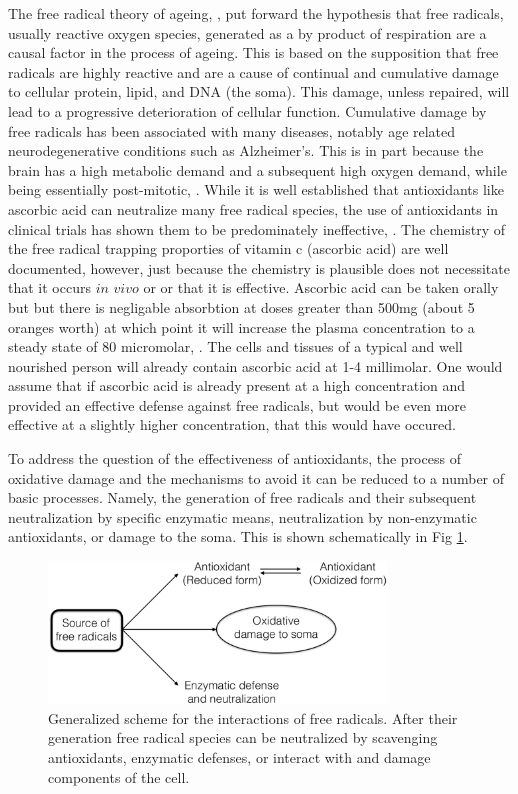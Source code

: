 \documentclass[preprint,12pt,authoryear]{elsarticle}
\begin{document}
The free radical theory of ageing, \citet{Harman:1956wu}, put forward the hypothesis that
free radicals, usually reactive oxygen species, generated as a by product of respiration are a causal
factor in the process of ageing. This is based on the supposition that free radicals are highly reactive
and are a cause of continual and cumulative damage to cellular protein, lipid, and
DNA (the soma). This damage, unless repaired, will lead to a progressive
deterioration of cellular function. Cumulative damage by free radicals has been associated
with many diseases, notably age related neurodegenerative conditions such as
Alzheimer's. This is in part because the brain has a high metabolic demand and a
subsequent high oxygen demand, while being essentially post-mitotic, \citet{Cobley:2018kt}.  
While it is well established that antioxidants like ascorbic acid can neutralize many free radical
species, the use of antioxidants in clinical trials has shown them to be predominately ineffective, \citet{Steinhubl:2008el}. 
The chemistry of the free radical trapping proporties of vitamin c (ascorbic acid) are well documented, however, just because the chemistry is plausible does not necessitate that it occurs $in$ $vivo$ or or that it is effective. Ascorbic acid can be taken orally but but there is negligable absorbtion at doses greater than 500mg (about 5 oranges worth) at which point it will increase the plasma concentration to a steady state of 80 micromolar, \citet{Padayatty:2003}. The cells and tissues of a typical and well nourished person will already contain ascorbic acid at 1-4 millimolar. One would assume that if ascorbic acid is already present at a high concentration and provided an effective defense against free radicals, but would be even more effective at a slightly higher concentration, that this would have occured.

To address the question of the effectiveness of antioxidants, the process of oxidative damage and the mechanisms to avoid it can be reduced to a number of basic processes. Namely, the generation of free radicals and their subsequent neutralization by specific enzymatic means, neutralization by non-enzymatic antioxidants, or damage to the soma. This is shown schematically in Fig \ref{fig:g1}.




\begin{figure}
\begin{center}
\includegraphics[width=0.8\textwidth]{Figure1.eps}
\end{center}
\caption{\label{fig:g1} Generalized scheme for the interactions of free radicals. After their generation
free radical species can be neutralized by scavenging antioxidants, enzymatic defenses, or
interact with and damage components of the cell.}
\end{figure}
\end{document}
